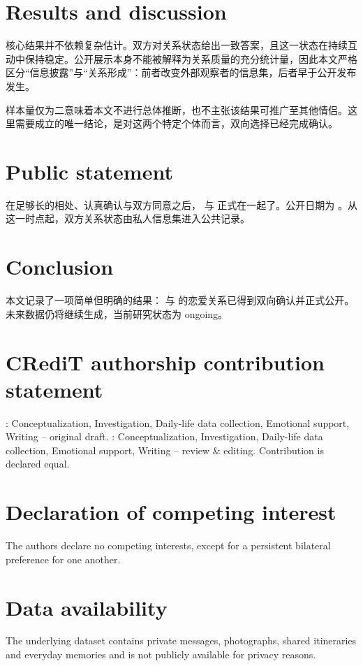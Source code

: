 \documentclass[9pt,twocolumn]{extarticle}
\begin{document}
\section{Results and discussion}
核心结果并不依赖复杂估计。双方对关系状态给出一致答案，且这一状态在持续互动中保持稳定。公开展示本身不能被解释为关系质量的充分统计量，因此本文严格区分“信息披露”与“关系形成”：前者改变外部观察者的信息集，后者早于公开发布发生。

样本量仅为二意味着本文不进行总体推断，也不主张该结果可推广至其他情侣。这里需要成立的唯一结论，是对这两个特定个体而言，双向选择已经完成确认。


\section{Public statement}
在足够长的相处、认真确认与双方同意之后，\PartnerA{} 与 \PartnerB{} 正式在一起了。公开日期为 \AnnouncementDate{}。从这一时点起，双方关系状态由私人信息集进入公共记录。

\section{Conclusion}
本文记录了一项简单但明确的结果：\PartnerA{} 与 \PartnerB{} 的恋爱关系已得到双向确认并正式公开。未来数据仍将继续生成，当前研究状态为 ongoing。

\section*{CRediT authorship contribution statement}
\PartnerA{}: Conceptualization, Investigation, Daily-life data collection, Emotional support, Writing -- original draft. \PartnerB{}: Conceptualization, Investigation, Daily-life data collection, Emotional support, Writing -- review \& editing. Contribution is declared equal.

\section*{Declaration of competing interest}
The authors declare no competing interests, except for a persistent bilateral preference for one another.

\section*{Data availability}
The underlying dataset contains private messages, photographs, shared itineraries and everyday memories and is not publicly available for privacy reasons.
\end{document}
